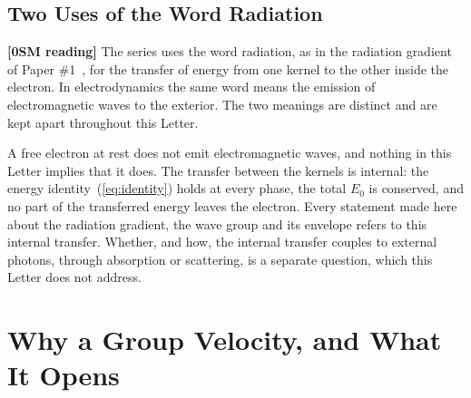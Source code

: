 \documentclass[%
 reprint, amsmath,amssymb, aps, prb, ]{revtex4-2}
\numberwithin{equation}{section}
\begin{document}
\subsection{Two Uses of the Word Radiation}
\label{app:radiation}

\textbf{[0SM reading]} The series uses the word radiation, as in the radiation gradient of Paper \#1~\cite{H01}, for the transfer of energy from one kernel to the other inside the electron. In electrodynamics the same word means the emission of electromagnetic waves to the exterior. The two meanings are distinct and are kept apart throughout this Letter.

A free electron at rest does not emit electromagnetic waves, and nothing in this Letter implies that it does. The transfer between the kernels is internal: the energy identity~(\ref{eq:identity}) holds at every phase, the total $E_0$ is conserved, and no part of the transferred energy leaves the electron. Every statement made here about the radiation gradient, the wave group and its envelope refers to this internal transfer. Whether, and how, the internal transfer couples to external photons, through absorption or scattering, is a separate question, which this Letter does not address.

\section{Why a Group Velocity, and What It Opens}
\label{app:why}
\end{document}
